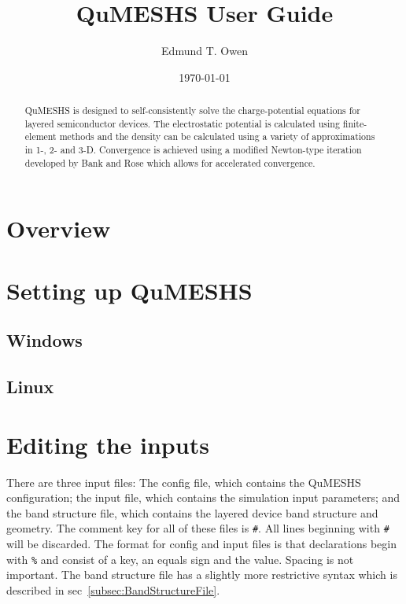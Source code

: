 \documentclass[12pt]{article}
\begin{document}
\title{QuMESHS User Guide}%
\author{Edmund T. Owen}%
\date{\today}%
\begin{abstract}
  QuMESHS is designed to self-consistently solve the charge-potential equations
  for layered semiconductor devices.  The electrostatic potential is calculated using
  finite-element methods and the density can be calculated using a variety of
  approximations in 1-, 2- and 3-D.  Convergence is achieved using a modified
  Newton-type iteration developed by Bank and Rose which allows for accelerated
  convergence.
\end{abstract}
\maketitle

\tableofcontents
\newpage

\section{Overview}

\section{Setting up QuMESHS}

\subsection{Windows}
\label{subsec:SetupWindows}

\subsection{Linux}
\label{subsec:SetupLinux}

\section{Editing the inputs}

There are three input files: The config file, which contains the QuMESHS configuration;
the input file, which contains the simulation input parameters; and the band structure
file, which contains the layered device band structure and geometry.  The comment key
for all of these files is \texttt{\#}.  All lines beginning with \texttt{\#} will be
discarded.  The format for config and input files is that declarations begin with
\texttt{\%} and consist of a key, an equals sign and the value.  Spacing is not important.
The band structure file has a slightly more restrictive syntax which is described in
sec~\ref{subsec:BandStructureFile}.
\end{document}
